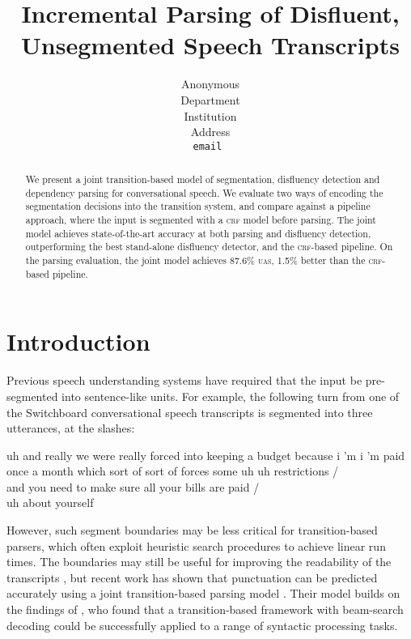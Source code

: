 \documentclass[11pt,letterpaper]{article}
\title{Incremental Parsing of Disfluent, Unsegmented Speech Transcripts}
\author{
	Anonymous\\
  	Department\\
  	Institution\\
  	Address\\
  {\tt \small email }\\
}
\date{}
\begin{document}
\maketitle
\begin{abstract}
We present a joint transition-based model of segmentation, disfluency detection
and dependency parsing for conversational speech.  We evaluate two ways of encoding
the segmentation decisions into the transition system, and compare against a pipeline
approach, where the input is segmented with a \textsc{crf} model before parsing.
The joint model achieves state-of-the-art accuracy at both parsing and disfluency
detection, outperforming the best stand-alone disfluency detector, and the
\textsc{crf}-based pipeline.
On the parsing evaluation, the joint model achieves 87.6\% \textsc{uas}, 1.5\%
better than the \textsc{crf}-based pipeline.
\end{abstract}

\section{Introduction}

Previous speech understanding systems have required that the input be
pre-segmented into sentence-like units. 
For example, the following turn from one of the Switchboard conversational speech
transcripts is segmented into three utterances, at the slashes:

\begin{lexample}
\small
uh and really we were really forced into keeping a budget because i 'm i 'm paid once a month which sort of sort of forces some uh uh restrictions / \\
and you need to make sure all your bills are paid / \\
uh about yourself
\end{lexample}

\noindent However, such segment boundaries may be less critical for transition-based
parsers, which often exploit heuristic search procedures to achieve linear run
times.  The boundaries may still be useful for improving the readability of
the transcripts \citep{jones:03}, but recent work has shown that punctuation
can be predicted accurately using a joint transition-based parsing model \citep{dongzhang:13}.
Their model builds on the findings of \citet{zhang:cl11}, who found that a
transition-based framework with beam-search decoding could be successfully applied
to a range of syntactic processing tasks.
\end{document}
